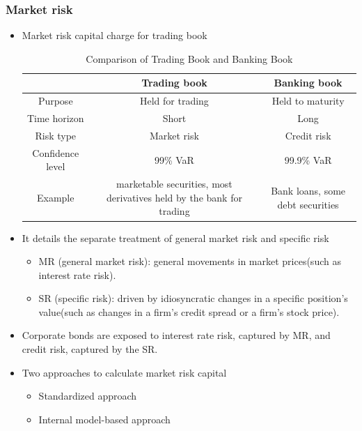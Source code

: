 \subsubsection{Market risk}
\begin{itemize}
\item Market risk capital charge for trading book


\begin{table}[h]
    \centering
    \caption{Comparison of Trading Book and Banking Book}
    \renewcommand{\arraystretch}{1.5} %
    \begin{tabular}{|c|c|c|}
        \hline
        \textbf{ } & \textbf{Trading book} & \textbf{Banking book} \\
        \hline
        Purpose & Held for trading & Held to maturity \\
        \hline
        Time horizon & Short & Long \\
        \hline
        Risk type & Market risk & Credit risk \\
        \hline
        Confidence level & 99\% VaR & 99.9\% VaR \\
        \hline
        Example & marketable securities, most derivatives held by the bank for trading & Bank loans, some debt securities \\
        \hline
    \end{tabular}
\end{table}


\item It details the separate treatment of general market risk and specific risk
    \begin{itemize}
    \item MR (general market risk): general movements in market prices(such as interest rate risk).
    \item SR (specific risk): driven by idiosyncratic changes in a specific position's value(such as changes in a firm's credit spread or a firm's stock price).
    \end{itemize}
\item Corporate bonds are exposed to interest rate risk, captured by MR, and credit risk, captured by the SR.
\item Two approaches to calculate market risk capital
    \begin{itemize}
    \item Standardized approach
    \item Internal model-based approach
    \end{itemize}
\end{itemize}



